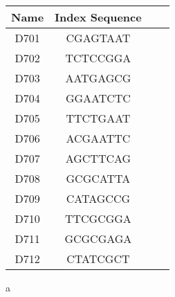 \begin{center}
\begin{threeparttable}
\begin{tabular}{cccc}\toprule
\textbf{Name} & \textbf{Index Sequence}\tnote{a}\\\midrule
D701 & CGAGTAAT\\
D702 & TCTCCGGA\\
D703 & AATGAGCG\\
D704 & GGAATCTC\\
D705 & TTCTGAAT\\
D706 & ACGAATTC\\
D707 & AGCTTCAG\\
D708 & GCGCATTA\\
D709 & CATAGCCG\\
D710 & TTCGCGGA\\
D711 & GCGCGAGA\\
D712 & CTATCGCT\\
\bottomrule
\end{tabular}
\begin{tablenotes}
\item[a] \parencite{illumina2018adapters}
\end{tablenotes}
\end{threeparttable}
\end{center}
